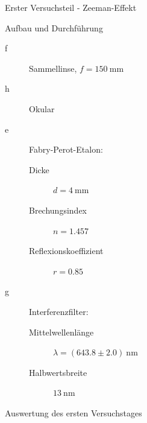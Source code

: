 \documentclass[pdftex, a4paper,11pt, twoside, ngerman]{report}
\begin{document}
\begin{chapter}{Erster Versuchsteil - Zeeman-Effekt}
\begin{section}{Aufbau und Durchführung}
\begin{minipage}{0.4\textwidth}
\begin{description}
          \item[f] Sammellinse, $f=\SI{150}{\milli\meter}$
          \item[h] Okular
        \end{description}
      \end{minipage}\quad
      \begin{minipage}{0.56\textwidth}
        \begin{description}
          \item[e] Fabry-Perot-Etalon: 
              \begin{description}
                \item[Dicke] $d=\SI{4}{\milli\meter}$
                \item[Brechungsindex] $n=1.457$
                \item[Reflexionskoeffizient] $r=0.85$
              \end{description}
          \item[g] Interferenzfilter:
              \begin{description}
                \item[Mittelwellenlänge] $\lambda=(643.8\pm2.0)
                    \SI{}{\nano\meter}$
                \item[Halbwertsbreite] $\SI{13}{\nano\meter}$
              \end{description}
        \end{description}
      \end{minipage}

    \end{section}
    
    
    
    \newpage
    \begin{section}{Auswertung des ersten Versuchstages}
      \label{chp:Zeeman:sec:Auswertung}
      
      
      

\end{section}
\end{chapter}
\end{document}
